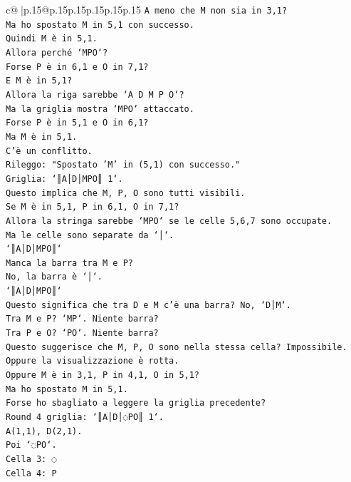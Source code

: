\documentclass{article}
\begin{document}
{\begin{supertabular}{c@{$\;$}|p{.15\linewidth}@{}p{.15\linewidth}p{.15\linewidth}p{.15\linewidth}p{.15\linewidth}p{.15\linewidth}}
{{{\texttt{A meno che M non sia in 3,1?} \\
\texttt{Ma ho spostato M in 5,1 con successo.} \\
\texttt{Quindi M è in 5,1.} \\
\texttt{Allora perché `MPO`?} \\
\texttt{Forse P è in 6,1 e O in 7,1?} \\
\texttt{E M è in 5,1?} \\
\texttt{Allora la riga sarebbe `A D M P O`?} \\
\texttt{Ma la griglia mostra `MPO` attaccato.} \\
\texttt{Forse P è in 5,1 e O in 6,1?} \\
\texttt{Ma M è in 5,1.} \\
\texttt{C'è un conflitto.} \\
\texttt{Rileggo: "Spostato 'M' in (5,1) con successo."} \\
\texttt{Griglia: `║A│D│MPO║ 1`.} \\
\texttt{Questo implica che M, P, O sono tutti visibili.} \\
\texttt{Se M è in 5,1, P in 6,1, O in 7,1?} \\
\texttt{Allora la stringa sarebbe `MPO` se le celle 5,6,7 sono occupate.} \\
\texttt{Ma le celle sono separate da `│`.} \\
\texttt{`║A│D│MPO║`} \\
\texttt{Manca la barra tra M e P?} \\
\texttt{No, la barra è `│`.} \\
\texttt{`║A│D│MPO║`} \\
\texttt{Questo significa che tra D e M c'è una barra? No, `D│M`.} \\
\texttt{Tra M e P? `MP`. Niente barra?} \\
\texttt{Tra P e O? `PO`. Niente barra?} \\
\texttt{Questo suggerisce che M, P, O sono nella stessa cella? Impossibile.} \\
\texttt{Oppure la visualizzazione è rotta.} \\
\texttt{Oppure M è in 3,1, P in 4,1, O in 5,1?} \\
\texttt{Ma ho spostato M in 5,1.} \\
\texttt{Forse ho sbagliato a leggere la griglia precedente?} \\
\texttt{Round 4 griglia: `║A│D│◌PO║ 1`.} \\
\texttt{A(1,1), D(2,1).} \\
\texttt{Poi `◌PO`.} \\
\texttt{Cella 3: ◌} \\
\texttt{Cella 4: P} \\
            }
        }
    }
     \\ \\


\end{supertabular}}
\end{document}
